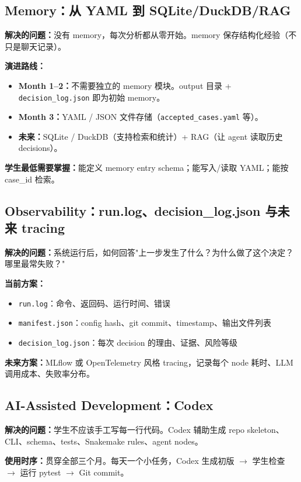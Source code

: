 \documentclass[11pt,a4paper,fontset=fandol]{ctexart}
\begin{document}
\subsection{Memory：从 YAML 到 SQLite/DuckDB/RAG}

\textbf{解决的问题：}没有 memory，每次分析都从零开始。memory 保存结构化经验（不只是聊天记录）。

\textbf{演进路线：}
\begin{itemize}
  \item \textbf{Month 1--2：}不需要独立的 memory 模块。output 目录 + \texttt{decision\_log.json} 即为初始 memory。
  \item \textbf{Month 3：}YAML / JSON 文件存储（\texttt{accepted\_cases.yaml} 等）。
  \item \textbf{未来：}SQLite / DuckDB（支持检索和统计）+ RAG（让 agent 读取历史 decisions）。
\end{itemize}

\textbf{学生最低需要掌握：}能定义 memory entry schema；能写入/读取 YAML；能按 case\_id 检索。

\subsection{Observability：run.log、decision\_log.json 与未来 tracing}

\textbf{解决的问题：}系统运行后，如何回答"上一步发生了什么？为什么做了这个决定？哪里最常失败？"

\textbf{当前方案：}
\begin{itemize}
  \item \texttt{run.log}：命令、返回码、运行时间、错误
  \item \texttt{manifest.json}：config hash、git commit、timestamp、输出文件列表
  \item \texttt{decision\_log.json}：每次 decision 的理由、证据、风险等级
\end{itemize}

\textbf{未来方案：}MLflow 或 OpenTelemetry 风格 tracing，记录每个 node 耗时、LLM 调用成本、失败率分布。

\subsection{AI-Assisted Development：Codex}

\textbf{解决的问题：}学生不应该手工写每一行代码。Codex 辅助生成 repo skeleton、CLI、schema、tests、Snakemake rules、agent nodes。

\textbf{使用时序：}贯穿全部三个月。每天一个小任务，Codex 生成初版 $\to$ 学生检查 $\to$ 运行 pytest $\to$ Git commit。
\end{document}
